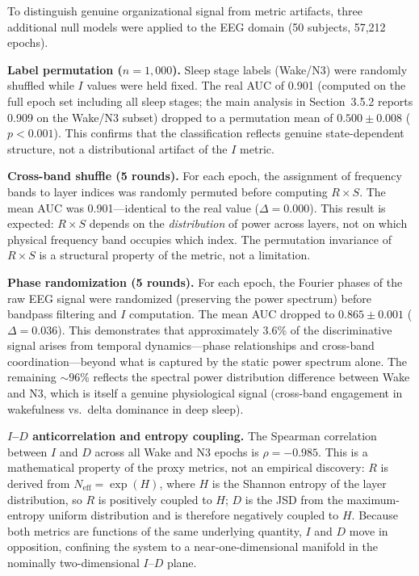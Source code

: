 \documentclass[aip,cha,reprint,amsmath,amssymb,final]{revtex4-2}
\begin{document}
To distinguish genuine organizational signal from metric artifacts, three additional null models were applied to the EEG domain (50 subjects, 57,212 epochs).

\textbf{Label permutation ($n = 1{,}000$).} Sleep stage labels (Wake/N3) were randomly shuffled while $I$ values were held fixed. The real AUC of 0.901 (computed on the full epoch set including all sleep stages; the main analysis in Section~3.5.2 reports 0.909 on the Wake/N3 subset) dropped to a permutation mean of $0.500 \pm 0.008$ ($p < 0.001$). This confirms that the classification reflects genuine state-dependent structure, not a distributional artifact of the $I$ metric.

\textbf{Cross-band shuffle (5 rounds).} For each epoch, the assignment of frequency bands to layer indices was randomly permuted before computing $R \times S$. The mean AUC was 0.901---identical to the real value ($\Delta = 0.000$). This result is expected: $R \times S$ depends on the \emph{distribution} of power across layers, not on which physical frequency band occupies which index. The permutation invariance of $R \times S$ is a structural property of the metric, not a limitation.

\textbf{Phase randomization (5 rounds).} For each epoch, the Fourier phases of the raw EEG signal were randomized (preserving the power spectrum) before bandpass filtering and $I$ computation. The mean AUC dropped to $0.865 \pm 0.001$ ($\Delta = 0.036$). This demonstrates that approximately 3.6\% of the discriminative signal arises from temporal dynamics---phase relationships and cross-band coordination---beyond what is captured by the static power spectrum alone. The remaining ${\sim}96$\% reflects the spectral power distribution difference between Wake and N3, which is itself a genuine physiological signal (cross-band engagement in wakefulness vs.\ delta dominance in deep sleep).

\textbf{$I$--$D$ anticorrelation and entropy coupling.} The Spearman correlation between $I$ and $D$ across all Wake and N3 epochs is $\rho = -0.985$. This is a mathematical property of the proxy metrics, not an empirical discovery: $R$ is derived from $N_{\text{eff}} = \exp(H)$, where $H$ is the Shannon entropy of the layer distribution, so $R$ is positively coupled to $H$; $D$ is the JSD from the maximum-entropy uniform distribution and is therefore negatively coupled to $H$. Because both metrics are functions of the same underlying quantity, $I$ and $D$ move in opposition, confining the system to a near-one-dimensional manifold in the nominally two-dimensional $I$--$D$ plane.
\end{document}
